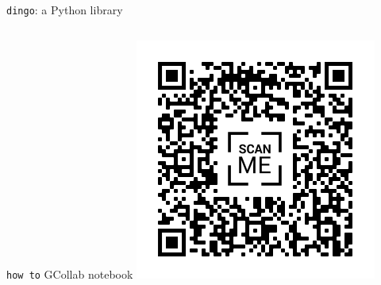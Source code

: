 \documentclass{beamer}
\begin{document}
\begin{frame}{\texttt{dingo}: a Python library }
\begin{columns}[onlytextwidth]
            \begin{center}
               \texttt{how to} GCollab notebook
               \includegraphics[scale=0.3]{../resources/dingo_collab_transparent.png}               
            \end{center}
 
      \end{columns}

   \end{frame}
\end{document}
